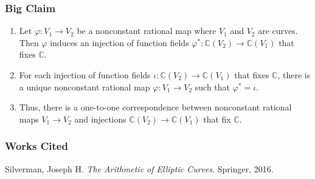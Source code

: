 \documentclass{beamer}
\theoremstyle{definition}
\begin{document}
    \begin{frame}
        \frametitle{Big Claim}

        \begin{enumerate}
            \item Let \(\varphi: V_1\to V_2\) be a nonconstant rational map where \(V_1\) and \(V_2\) are curves. Then \(\varphi\) induces an injection of function fields \(\varphi^\ast: \mathbb{C}(V_2) \to \mathbb{C}(V_1)\) that fixes \(\mathbb{C}\).

            \item For each injection of function fields \(\iota : \mathbb{C}(V_2)\to \mathbb{C}(V_1)\) that fixes \(\mathbb{C}\), there is a unique nonconstant rational map \(\varphi: V_1 \to V_2\) such that \(\varphi^\ast = \iota\).

            \item Thus, there is a one-to-one correspondence between nonconstant rational maps \(V_1 \to V_2\) and injections \(\mathbb{C}(V_2) \to \mathbb{C}(V_1)\) that fix \(\mathbb{C}\).
    \end{enumerate}

    \end{frame}

    \begin{frame}
        \frametitle{Works Cited}

        Silverman, Joseph H. \emph{The Arithmetic of Elliptic Curves}. Springer, 2016. 
    \end{frame}
\end{document}
